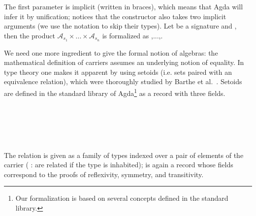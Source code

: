 \noindent The first parameter  is implicit (written in braces), which means that Agda
will infer it by unification; notices that the constructor  also
takes two implicit arguments (we use the notation  to skip their
types). Let  be a signature and  \AgdaSymbol{:}   ,
then the product $\mathcal{A}_{s_1} \times ... \times \mathcal{A}_{s_n}$ is
formalized as   \AgdaSymbol{[} ,...,\AgdaSymbol{]}.

We need one more ingredient to give the formal notion of algebras: the
mathematical definition of carriers assumes an underlying notion of
equality.  In type theory one makes it apparent by using setoids (i.e. 
sets paired with an equivalence relation), which were thoroughly
studied by Barthe et al.~\cite{barthe-setoids-2003}. Setoids are
defined in the standard library \cite{danielsson-agdalib} of
Agda\footnote{Our formalization is based on several concepts defined
  in the standard library.} as a record with three
fields.

\begin{code}
\>[0]\AgdaSpace{}%
\AgdaSpace{}%
\AgdaSymbol{:}\AgdaSpace{}%
\AgdaSpace{}%
\<%
\\
\>[0][@{}l@{\AgdaIndent{0}}]%
\>[2]\<%
\\
\>[2][@{}l@{\AgdaIndent{0}}]%
\>[4]%
\>[18]\AgdaSymbol{:}\AgdaSpace{}%
\<%
\\
%
\>[4]%
\>[18]\AgdaSymbol{:}\AgdaSpace{}%
\AgdaSpace{}%
\AgdaSpace{}%
\AgdaSpace{}%
\AgdaSpace{}%
\<%
\\
%
\>[4]\AgdaSpace{}%
\AgdaSymbol{:}\AgdaSpace{}%
\AgdaSpace{}%
\<%
\end{code}


\noindent The relation is given as a family of types indexed over a pair
of elements of the carrier (  :  are related if the type
  is inhabited); \AgdaSpace{}%
 is again a record whose fields
correspond to the proofs of reflexivity, symmetry, and transitivity.

